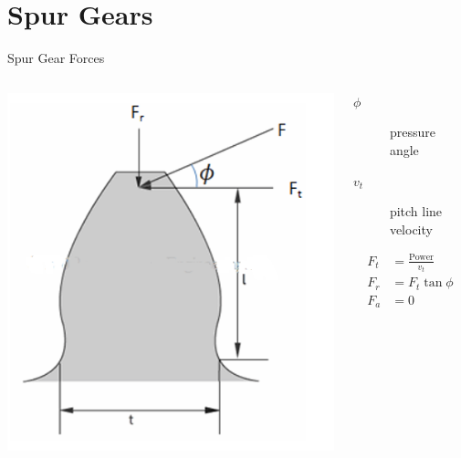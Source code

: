 \documentclass[10pt, svgnames]{beamer}
\begin{document}
\section{Spur Gears}
\label{spur-gears}
\begin{frame}[label={sec:org135a33d}]{Spur Gear Forces}
\begin{columns}
\begin{column}{0.5\columnwidth}
\begin{center}
\includegraphics[width=.9\linewidth]{pictures/spur-gear-forces.png}
\end{center}
\end{column}

\begin{column}{0.5\columnwidth}
\begin{description}
\item[{\(\phi\)}] pressure angle

\item[{\(v_{t}\)}] pitch line velocity
\end{description}

\begin{align*}
  F_{t} &= \frac{\text{Power}}{v_{t}} \\
  F_{r} &= F_{t} \tan \phi \\
  F_{a} &= 0
\end{align*}
\end{column}
\end{columns}
\end{frame}
\end{document}
